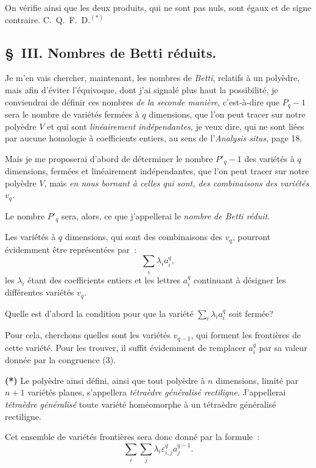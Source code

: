 \documentclass{article}
\begin{document}
On vérifie ainsi que les deux produits, qui ne sont pas nuls, sont égaux et de signe contraire. C.~Q.~F.~D.${}^{(*)}$

\subsection*{\S~III. Nombres de Betti réduits.}

Je m'en vais chercher, maintenant, les nombres de \emph{Betti}, relatifs à un polyèdre, mais afin d'éviter l'équivoque, dont j'ai signalé plus haut la possibilité, je conviendrai de définir ces nombres \emph{de la seconde manière}, c'est-à-dire que $P_{q} - 1$ sera le nombre de variétés fermées à $q$ dimensions, que l'on peut tracer sur notre polyèdre $V$ et qui sont \emph{linéairement indépendantes}, je veux dire, qui ne sont liées par aucune homologie à coefficients entiers, au sens de l'\emph{Analysis situs}, page 18.

Mais je me proposerai d'abord de déterminer le nombre $P'_{q} - 1$ des variétés à $q$ dimensions, fermées et linéairement indépendantes, que l'on peut tracer sur notre polyèdre $V$, mais \emph{en nous bornant à celles qui sont, des combinaisons des variétés $v_{q}$}.

Le nombre $P'_{q}$ sera, alors, ce que j'appellerai le \emph{nombre de Betti réduit}.

Les variétés à $q$ dimensions, qui sont des combinaisons des $v_{q}$, pourront évidemment être représentées par~:
\[ \sum_{i} \lambda_{i} a^{q}_{i}, \]
les $\lambda_{i}$ étant des coefficients entiers et les lettres $a^{q}_{i}$ continuant à désigner les différentes variétés $v_{q}$.

Quelle est d'abord la condition pour que la variété $\displaystyle\sum_{i} \lambda_{i} a^{q}_{i}$ soit fermée?

Pour cela, cherchons quelles sont les variétés $v_{q-1}$, qui forment les frontières de cette variété. Pour les trouver, il suffit évidemment de remplacer $a^{q}_{i}$ par sa valeur donnée par la congruence (3).

\textbf{(*)} Le polyèdre ainsi défini, ainsi que tout polyèdre à $n$ dimensions, limité par $n+1$ variétés planes, s'appellera \emph{tétraèdre généralisé rectiligne}. J'appellerai \emph{tétraèdre généralisé} toute variété homéomorphe à un tétraèdre généralisé rectiligne.


Cet ensemble de variétés frontières sera donc donné par la formule~:
\[ \sum_{i} \sum_{j} \lambda_{i} \varepsilon^{q}_{i,j} a^{q-1}_{j}. \]
\end{document}
